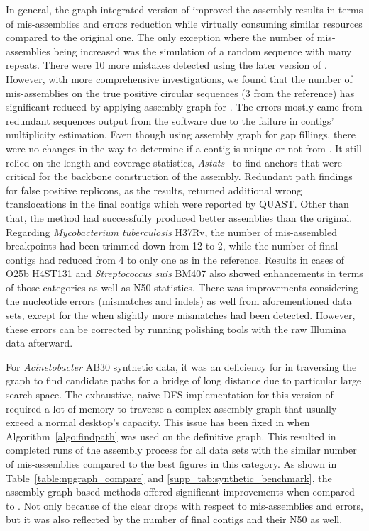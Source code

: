 In general, the graph integrated version of \npscarf{} improved the assembly results in terms of mis-assemblies and errors reduction while virtually consuming similar resources compared to the original one.
The only exception where the number of mis-assemblies being increased was the simulation of a random sequence with many repeats. There were 10 more mistakes detected using the later version of \npscarf{}. However, with more comprehensive investigations, we found that the number of mis-assemblies on the true positive circular sequences (3 from the reference) has significant reduced by applying assembly graph for \npscarf{}. The errors mostly came from redundant sequences output from the software due to the failure in contigs' multiplicity estimation.
Even though using assembly graph for gap fillings, there were no changes in the way to determine if a contig is unique or not from \npscarfg{}. 
It still relied on the length and coverage statistics, \IE{} \emph{Astats}~\cite{MyersSD2000} to find anchors that were critical for the backbone construction of the assembly.
Redundant path findings for false positive replicons, as the results, returned additional wrong translocations in the final contigs which were reported by QUAST. 
Other than that, the method had successfully produced better assemblies than the original. Regarding \emph{Mycobacterium tuberculosis} H37Rv, the number of mis-assembled breakpoints had been trimmed down from 12 to 2, while the number of final contigs had reduced from 4 to only one as in the reference. Results in cases of \ec{} O25b H4ST131 and \emph{Streptococcus suis} BM407 also showed enhancements in terms of those categories as well as N50 statistics. 
There was improvements considering the nucleotide errors (mismatches and indels) as well from aforementioned data sets, except for the \ec{} when slightly more mismatches had been detected. However, these errors can be corrected by running polishing tools with the raw Illumina data afterward. 

For \emph{Acinetobacter} AB30 synthetic data, it was an deficiency for \npscarfg{} in traversing the graph to find candidate paths for a bridge of long distance due to particular large search space.
The exhaustive, naive DFS implementation for this version of \npscarf{} required a lot of memory to traverse a complex assembly graph that usually exceed a normal desktop's capacity.
This issue has been fixed in \npgraph{} when Algorithm~\ref{algo:findpath} was used on the definitive graph. This resulted in completed runs of the assembly process for all data sets with the similar number of mis-assemblies compared to the best figures in this category.
As shown in Table~\ref{table:npgraph_compare} and \ref{supp_tab:synthetic_benchmark}, the assembly graph based methods offered significant improvements when compared to \npscarf{}. Not only because of the clear drops with respect to mis-assemblies and errors, but it was also reflected by the number of final contigs and their N50 as well.

